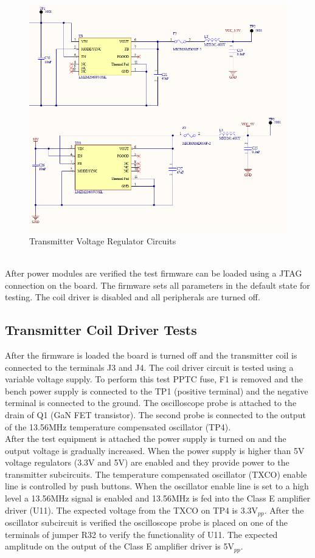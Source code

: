 \documentclass[12pt]{article}
\begin{document}
\hfill
\begin{figure}[h!]
\centering
\includegraphics[width=0.82\linewidth]{Transmitter_power_supply_sch_diag}
\caption{Transmitter Voltage Regulator Circuits}
\end{figure}

\hfill \\
\indent
After power modules are verified the test firmware can be loaded using a JTAG connection on the board.  The firmware sets all parameters in the default state for testing. The coil driver is disabled and all peripherals are turned off.

\subsection{Transmitter Coil Driver Tests}
\indent \indent
After the firmware is loaded the board is turned off and the transmitter coil is connected to the terminals J3 and J4. The coil driver circuit is tested using a variable voltage supply. To perform this test PPTC fuse, F1 is removed and the bench power supply is connected to the TP1 (positive terminal) and the negative terminal is connected to the ground.  The oscilloscope probe is attached to the drain of  Q1 (GaN FET transistor).  The second probe is connected to the output of the 13.56MHz temperature compensated oscillator (TP4).\\

\indent
After the test equipment is attached the power supply is turned on and the output voltage is gradually increased. When the power supply is higher than 5V voltage regulators (3.3V and 5V) are enabled and they provide power to the transmitter subcircuits.  The temperature compensated oscillator (TXCO) enable line is controlled by push buttons. When the oscillator enable line is set to a high level a 13.56MHz signal is enabled and 13.56MHz is fed into the Class E amplifier driver (U11). The expected voltage from the TXCO on TP4 is 3.3V$_{pp}$.  After the oscillator subcircuit is verified the oscilloscope probe is placed on one of the terminals of jumper R32 to verify the functionality of U11. The expected amplitude on the output of the Class E amplifier driver is 5V$_{pp}$.\\
\end{document}
